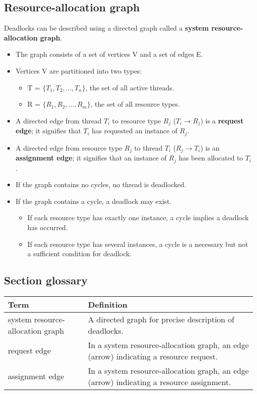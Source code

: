 \subsection{Resource-allocation graph}
Deadlocks can be described using a directed graph called a \textbf{system resource-allocation graph}.
\begin{itemize}
    \item The graph consists of a set of vertices V and a set of edges E.
    \item Vertices V are partitioned into two types:
    \begin{itemize}
        \item T = $\{T_1, T_2, \dots, T_n\}$, the set of all active threads.
        \item R = $\{R_1, R_2, \dots, R_m\}$, the set of all resource types.
    \end{itemize}
    \item A directed edge from thread $T_i$ to resource type $R_j$ ($T_i \rightarrow R_j$) is a \textbf{request edge}; it signifies that $T_i$ has requested an instance of $R_j$.
    \item A directed edge from resource type $R_j$ to thread $T_i$ ($R_j \rightarrow T_i$) is an \textbf{assignment edge}; it signifies that an instance of $R_j$ has been allocated to $T_i$.
    \item If the graph contains no cycles, no thread is deadlocked.
    \item If the graph contains a cycle, a deadlock may exist.
    \begin{itemize}
        \item If each resource type has exactly one instance, a cycle implies a deadlock has occurred.
        \item If each resource type has several instances, a cycle is a necessary but not a sufficient condition for deadlock.
    \end{itemize}
\end{itemize}

\subsection*{Section glossary}
\begin{tabular}{p{}p{}}
\toprule
\textbf{Term} & \textbf{Definition} \\
\midrule
\rowcolor{gray!10}
system resource-allocation graph & A directed graph for precise description of deadlocks. \\
request edge & In a system resource-allocation graph, an edge (arrow) indicating a resource request. \\
\rowcolor{gray!10}
assignment edge & In a system resource-allocation graph, an edge (arrow) indicating a resource assignment. \\
\bottomrule
\end{tabular}
